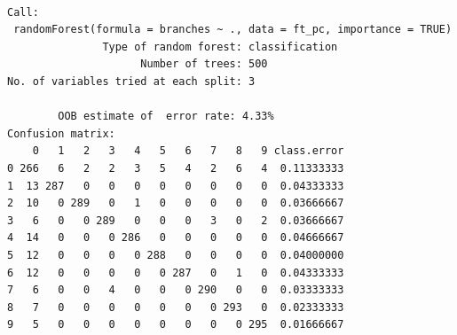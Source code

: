 \documentclass[
  letterpaper,
]{book}
\begin{document}
\begin{verbatim}

Call:
 randomForest(formula = branches ~ ., data = ft_pc, importance = TRUE) 
               Type of random forest: classification
                     Number of trees: 500
No. of variables tried at each split: 3

        OOB estimate of  error rate: 4.33%
Confusion matrix:
    0   1   2   3   4   5   6   7   8   9 class.error
0 266   6   2   2   3   5   4   2   6   4  0.11333333
1  13 287   0   0   0   0   0   0   0   0  0.04333333
2  10   0 289   0   1   0   0   0   0   0  0.03666667
3   6   0   0 289   0   0   0   3   0   2  0.03666667
4  14   0   0   0 286   0   0   0   0   0  0.04666667
5  12   0   0   0   0 288   0   0   0   0  0.04000000
6  12   0   0   0   0   0 287   0   1   0  0.04333333
7   6   0   0   4   0   0   0 290   0   0  0.03333333
8   7   0   0   0   0   0   0   0 293   0  0.02333333
9   5   0   0   0   0   0   0   0   0 295  0.01666667
\end{verbatim}
\end{document}
